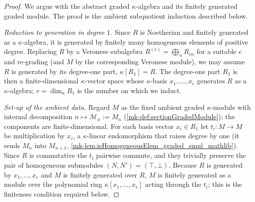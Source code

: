\begin{proof}
  \leanok
  We argue with the abstract graded \(\kappa\)-algebra and its finitely generated
  graded module. The proof is the ambient subquotient induction described below.

  \emph{Reduction to generation in degree \(1\).} Since \(R\) is Noetherian and
  finitely generated as a \(\kappa\)-algebra, it is generated by finitely many
  homogeneous elements of positive degree. Replacing \(R\) by a Veronese
  subalgebra \(R^{(e)} = \bigoplus_n R_{en}\) for a suitable \(e\) and re-grading
  (and \(M\) by the corresponding Veronese module), we may assume \(R\) is
  generated by its degree-one part, \(\kappa[R_1] = R\). The degree-one part
  \(R_1\) is then a finite-dimensional \(\kappa\)-vector space whose \(\kappa\)-basis
  \(x_1, \dots, x_r\) generates \(R\) as a \(\kappa\)-algebra; \(r = \dim_\kappa R_1\)
  is the number on which we induct.

  \emph{Set-up of the ambient data.} Regard \(M\) as the fixed ambient graded
  \(\kappa\)-module with internal decomposition \(n \mapsto \mathcal{M}_n := M_n\)
  (\ref{mk-def:sectionGradedModule}); the components are finite-dimensional. For each
  basis vector \(x_i \in R_1\) let \(t_i : M \to M\) be multiplication by \(x_i\), a
  \(\kappa\)-linear endomorphism that raises degree by one (it sends \(M_n\) into
  \(M_{n+1}\), \ref{mk-lem:isHomogeneousElem_graded_smul_mathlib}). Since \(R\) is
  commutative the \(t_i\) pairwise commute, and they trivially preserve the pair of
  homogeneous submodules \((N, N') = (\top, \bot)\). Because \(R\) is generated by
  \(x_1, \dots, x_r\) and \(M\) is finitely generated over \(R\), \(M\) is finitely
  generated as a module over the polynomial ring \(\kappa[x_1, \dots, x_r]\) acting
  through the \(t_i\); this is the finiteness condition required below.


\end{proof}
